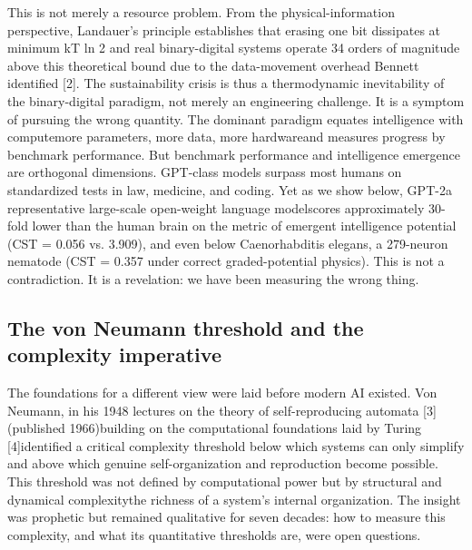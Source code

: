 \documentclass[a4paper,12pt]{article}
\begin{document}
This is not merely a resource problem. From the physical-information perspective, Landauer's principle establishes that erasing one bit dissipates at minimum kT ln 2  and real binary-digital systems operate 34 orders of magnitude above this theoretical bound due to the data-movement overhead Bennett identified [2]. The sustainability crisis is thus a thermodynamic inevitability of the binary-digital paradigm, not merely an engineering challenge. It is a symptom of pursuing the wrong quantity. The dominant paradigm equates intelligence with computemore parameters, more data, more hardwareand measures progress by benchmark performance. But benchmark performance and intelligence emergence are orthogonal dimensions. GPT-class models surpass most humans on standardized tests in law, medicine, and coding. Yet as we show below, GPT-2a representative large-scale open-weight language modelscores approximately 30-fold lower than the human brain on the metric of emergent intelligence potential (CST = 0.056 vs. 3.909), and even below Caenorhabditis elegans, a 279-neuron nematode (CST = 0.357 under correct graded-potential physics). This is not a contradiction. It is a revelation: we have been measuring the wrong thing.


\subsection{The von Neumann threshold and the complexity imperative}


The foundations for a different view were laid before modern AI existed. Von Neumann, in his 1948 lectures on the theory of self-reproducing automata [3] (published 1966)building on the computational foundations laid by Turing [4]identified a critical complexity threshold below which systems can only simplify and above which genuine self-organization and reproduction become possible. This threshold was not defined by computational power but by structural and dynamical complexitythe richness of a system's internal organization. The insight was prophetic but remained qualitative for seven decades: how to measure this complexity, and what its quantitative thresholds are, were open questions.
\end{document}
